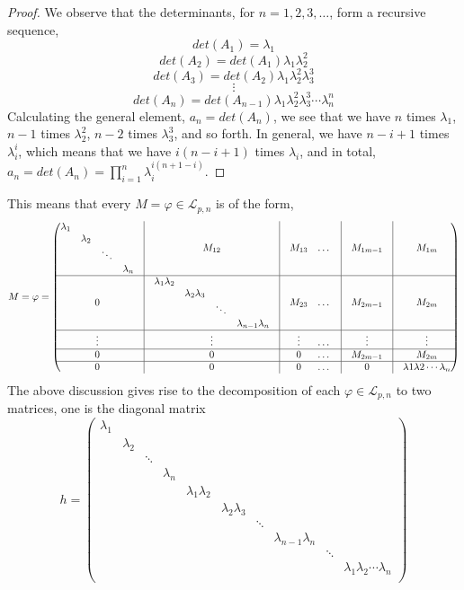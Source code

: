 \documentclass[12pt]{article}
\begin{document}
\begin{proof}
We observe that the determinants, for $n=1,2,3,\dots$, form a recursive sequence, $$
det(A_1)=\lambda_1$$
$$det(A_2)=det(A_1)\lambda_1\lambda_2^2$$
$$det(A_3)=det(A_2)\lambda_1\lambda_2^2\lambda_3^3$$
$$\vdots$$
$$det(A_n)=det(A_{n-1})\lambda_1\lambda_2^2\lambda_3^3\cdots\lambda_n^n$$
Calculating the general element, $a_n=det(A_n)$, we see that we have $n$ times $\lambda_1$, $n-1$ times $\lambda_2^2$, $n-2$ times $\lambda_3^3$, and so forth. In general, we have $n-i+1$ times $\lambda_i^i$, which means that we have $i(n-i+1)$ times $\lambda_i$, and in total, $a_n=det(A_n)=\prod_{i=1}^n\lambda_i^{i(n+1-i)}$.
\end{proof}
This means that every $M=\varphi\in\mathcal{L}_{p,n}$ is of the form,$$M=\varphi=\begin{pmatrix}
\begin{matrix}\lambda_1 & & &\\
& \lambda_2 & &\\
& & \ddots &\\
& & & \lambda_n\\
\end{matrix} & \vline & M_{12}&\vline & M_{13} & \dots& \vline & M_{1m-1} & \vline&M_{1m}\\
\hline
0 & \vline & \begin{matrix}\lambda_1\lambda_2 & & &\\
& \lambda_2\lambda_3 & &\\
& & \ddots &\\
& & & \lambda_{n-1}\lambda_n\\
\end{matrix}&\vline & M_{23} & \dots &\vline & M_{2m-1} &\vline& M_{2m}\\
\hline
\vdots & \vline & \vdots&\vline & \vdots & \dots &\vline & \vdots &\vline& \vdots\\
\hline
0 & \vline & 0&\vline & 0 & \dots &\vline & M_{2m-1} &\vline& M_{2m}\\
\hline
0 & \vline & 0 &\vline & 0 & \dots &\vline & 0 &\vline& \lambda1\lambda2\cdots\lambda_n\\
\end{pmatrix}$$
The above discussion gives rise to the decomposition of each $\varphi\in\mathcal{L}_{p,n}$ to two matrices, one is the diagonal matrix $$h=\begin{pmatrix}
\lambda_1 & & & & & & & &\\
& \lambda_2 & & & & & & &\\
& & \ddots & & & & & &\\
& & & \lambda_n & & & & &\\
& & & & \lambda_1\lambda_2 & & & &\\
& & & & & \lambda_2\lambda_3 & & &\\
& & & & & & \ddots & &\\
& & & & & & & \lambda_{n-1}\lambda_n & &\\
& & & & & & & & \ddots &\\
& & & & & & & & & \lambda_1\lambda_2\cdots\lambda_n\\
\end{pmatrix}
$$
\end{document}
